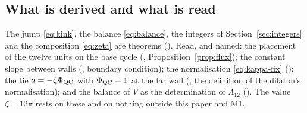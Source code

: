 \subsection{What is derived and what is read}\label{sec:summary4}

The jump \eqref{eq:kink}, the balance \eqref{eq:balance}, the integers of
Section~\ref{sec:integers} and the composition \eqref{eq:zeta} are
theorems (\rigR). Read, and named: the placement of the twelve units on
the base cycle (\rigD, Proposition~\ref{prop:flux}); the constant slope
between walls (\rigD, boundary condition); the normalisation
\eqref{eq:kappa-fix} (\rigD); the tie $a=-\zeta\Phi_{\mathrm{QC}}$ with $\Phi_{\mathrm{QC}}=1$ at the
far wall (\rigD, the definition of the dilaton's normalisation); and the
balance of $V$ as the determination of $\Lambda_{12}$ (\rigD). The value
$\zeta=12\pi$ rests on these and on nothing outside this paper and M1.
